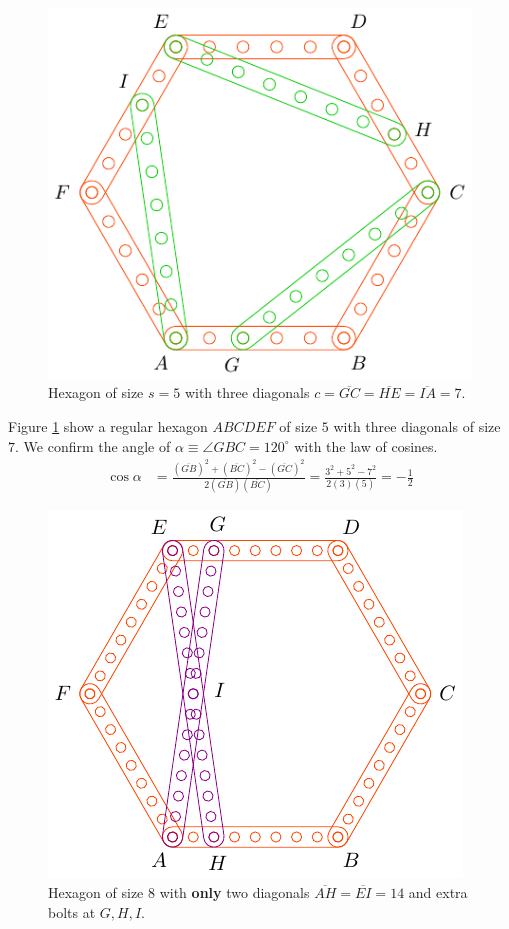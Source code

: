 \documentclass[11pt]{article}
\begin{document}
\begin{figure}[H]
\centering
\includegraphics[scale=1]{5/hexa-5a}
\caption{Hexagon of size $s = 5$ with three diagonals $c = \overline{GC} = \overline{HE} = \overline{IA} = 7$.}
\label{fig:5a}
\end{figure}

Figure \ref{fig:5a} show a regular hexagon $ABCDEF$ of size $5$ with three diagonals of size $7$. We confirm the angle of $\alpha \equiv \angle{GBC} = 120^\circ$ with the law of cosines.
\begin{align}
\cos\alpha &= \frac{(\overline{GB})^2 + (\overline{BC})^2 - (\overline{GC})^2}
 {2(\overline{GB})(\overline{BC})}
 = \frac{3^2 + 5^2 - 7^2}{2(3)(5)} = -\frac{1}2 \nonumber
\end{align}

\begin{figure}[H]
\centering
\includegraphics[scale=1]{8/hexa-8a}
\caption{Hexagon of size $8$ with \textbf{only} two diagonals $\overline{AH} = \overline{EI} = 14$ and extra bolts at $G,H,I$.}
\label{fig:8a}
\end{figure}
\end{document}
